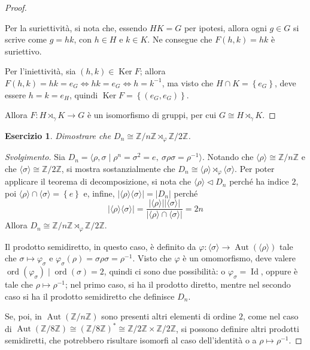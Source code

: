 \documentclass[11pt]{article}
\theoremstyle{style}
\newtheorem{esercizio}{Esercizio}[section]
\newenvironment{svolgimento}{\renewcommand\qedsymbol{$\blacksquare$}\begin{proof}[Svolgimento]}{\end{proof}}
\numberwithin{equation}{subsection}
\begin{document}
\begin{proof}
\begin{itemize}
				Per la suriettivit\`a, si nota che, essendo $HK = G$ per ipotesi, allora ogni $g \in G$ si scrive come $g = hk$, con $h \in H$ e $k \in K$.
				Ne consegue che $F(h,k) = hk$ \`e suriettivo.

				Per l'iniettivit\`a, sia $(h,k) \in \operatorname{Ker} F$; allora $F(h,k) = hk = e_G \iff hk = e_G \iff h = k^{-1}$, ma visto che $H\cap K = \left\{ e_G \right\} $, deve essere $h=k = e_H$, quindi $\operatorname{Ker} F = \left\{ (e_G,e_G) \right\} $.
		\end{itemize}
	Allora $F: H\rtimes _\gamma K \to G$ \`e un isomorfismo di gruppi, per cui $G \cong H \rtimes _\gamma K$.
	\end{proof}
\begin{esercizio}
Dimostrare che $D_n \cong \mathbb{Z}/ n\mathbb{Z}\rtimes _\varphi \mathbb{Z}/ 2\mathbb{Z}$.
\end{esercizio}
\begin{svolgimento}
	Sia $D_n = \langle \rho , \sigma   \mid \rho ^n = \sigma ^2 = e, \ \sigma \rho \sigma = \rho ^{-1} \rangle$. 
	Notando che $\langle \rho  \rangle\cong \mathbb{Z} / n \mathbb{Z}$ e che $\langle \sigma  \rangle\cong \mathbb{Z} / 2 \mathbb{Z}$, si mostra sostanzialmente che $D_n\cong \langle \rho  \rangle\rtimes_\varphi  \langle \sigma  \rangle$.
	Per poter applicare il teorema di decomposizione, si nota che $\langle \rho  \rangle \lhd D_n$ perch\'e ha indice $2$, poi $\langle \rho  \rangle\cap \langle \sigma  \rangle = \left\{ e \right\} $ e, infine, $\lvert \langle \rho  \rangle\langle \sigma  \rangle \rvert = \lvert D_n \rvert $ perch\'e
\[
\lvert \langle \rho  \rangle\langle \sigma  \rangle \rvert = \frac{\lvert \langle \rho  \rangle \rvert \lvert \langle \sigma  \rangle \rvert }{\lvert \langle \rho  \rangle\cap\langle \sigma  \rangle \rvert } = 2n
\] 
Allora $D_n \cong \mathbb{Z}/n\mathbb{Z}\rtimes _\varphi \mathbb{Z}/2\mathbb{Z}$.

	Il prodotto semidiretto, in questo caso, \`e definito da $\varphi : \langle \sigma  \rangle\to \operatorname{Aut} (\langle \rho  \rangle)$ tale che $\sigma \longmapsto \varphi _\sigma  $ e $\varphi _\sigma (\rho ) = \sigma \rho \sigma = \rho ^{-1}$.
	Visto che $\varphi$ \`e un omomorfismo, deve valere $\operatorname{ord}(\varphi _\sigma )  \mid \operatorname{ord}(\sigma  ) =2$, quindi ci sono due possibilit\`a: o $\varphi _\sigma  = \operatorname{Id} $, oppure \`e tale che $\rho \longmapsto \rho ^{-1}$; nel primo caso, si ha il prodotto diretto, mentre nel secondo caso si ha il prodotto semidiretto che definisce $D_n$.

	Se, poi, in $\operatorname{Aut} (\mathbb{Z}/n\mathbb{Z})$ sono presenti altri elementi di ordine $2$, come nel caso di $\operatorname{Aut} (\mathbb{Z}/8\mathbb{Z})\cong (\mathbb{Z}/8\mathbb{Z})^* \cong \mathbb{Z}/2\mathbb{Z}\times \mathbb{Z}/2\mathbb{Z}$, si possono definire altri prodotti semidiretti, che potrebbero risultare isomorfi al caso dell'identit\`a o a $\rho \longmapsto \rho ^{-1}$.
\end{svolgimento}
\end{document}
